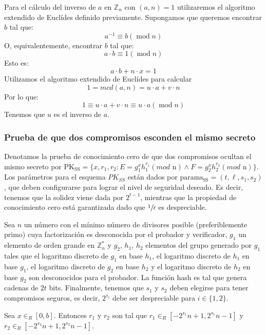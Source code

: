 \begin{proposition}
Para el cálculo del inverso de $a$ en $\mathbb{Z}_{n}$ con $(a, n) = 1$ utilizaremos el algoritmo extendido de Euclídes definido previamente. Supongamos que queremos encontrar $b$ tal que:
$$a^{-1} \equiv b (\operatorname{mod} n)$$
O, equivalentemente, encontrar $b$ tal que:
$$a \cdot b \equiv 1 (\operatorname{mod} n)$$
Esto es:
$$a \cdot b + n \cdot x = 1$$
Utilizamos el algoritmo extendido de Euclídes para calcular 
$$1 = mcd(a, n) = u \cdot a + v \cdot n$$
Por lo que:
$$1 \equiv u \cdot a + v \cdot n \equiv u \cdot a (\operatorname{mod} n)$$
Tenemos que $u$ es el inverso de $a$.
\end{proposition}

\subsubsection{Prueba de que dos compromisos esconden el mismo secreto} \label{proof:ss}

Denotamos la prueba de conocimiento cero de que dos compromisos ocultan el mismo secreto por $\operatorname{PK_{SS}} = \{x, r_{1}, r_{2}: E = g_{1}^{x}h_{1}^{r_{1}} (mod \text{ n}) \wedge F = g_{2}^{x}h_{2}^{r_{2}} (mod \text{ n})\}$. Los parámetros para el esquema $PK_{SS}$ están dados por $\operatorname{params_{SS}} = (t, \ell, s_{1}, s_{2})$, que deben configurarse para lograr el nivel de seguridad deseado. Es decir, tenemos que la solidez viene dada por $2^{t-1}$, mientras que la propiedad de conocimiento cero está garantizada dado que $\sfrac{1}{\ell}$ es despreciable.

Sea $n$ un número con el mínimo número de divisores posible (preferiblemente primo) cuya factorización es desconocida por el probador y verificador, $g_{1}$ un elemento de orden grande en $\mathbb{Z}^{*}_{n}$ y $g_{2}$, $h_{1}$, $h_{2}$ elementos del grupo generado por $g_{1}$ tales que el logaritmo discreto de $g_{1}$ en base $h_{1}$, el logaritmo discreto de $h_{1}$ en base $g_{1}$, el logaritmo discreto de $g_{2}$ en base $h_{2}$ y el logaritmo discreto de $h_{2}$ en base $g_{2}$ son desconocidos para el probador. La función hash es tal que genera cadenas de $2t$ bits. Finalmente, tenemos que $s_{1}$ y $s_{2}$ deben elegirse para tener compromisos seguros, es decir, $2^{s_{i}}$ debe ser despreciable para $i \in \{1, 2\}$.

Sea $x \in_{R} [0, b]$. Entonces $r_{1}$ y $r_{2}$ son tal que $r_{1} \in_{R} [-2^{s_{1}}n + 1, 2^{s_{1}}n-1]$ y $r_{2} \in_{R} [-2^{s_{2}}n + 1, 2^{s_{2}}n-1]$.


